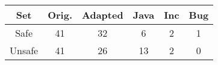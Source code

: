 \begin{tabular}{cccccc}\toprule
\textbf{Set} & \textbf{Orig.} & \textbf{Adapted} & \textbf{Java} & \textbf{Inc} & \textbf{Bug} \\ \midrule
Safe & 41 & 32 & 6 & 2 & 1
\\
Unsafe & 41 & 26 & 13 & 2 & 0
\end{tabular}
